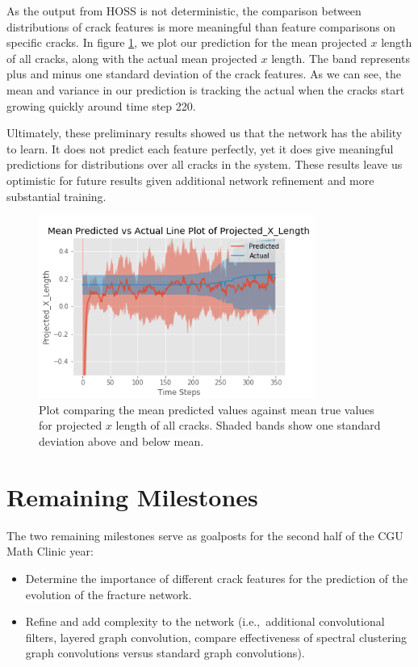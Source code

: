 As the output from HOSS is not deterministic, the comparison between distributions of crack features is more meaningful than feature comparisons on specific cracks. In figure \ref{fig:mean_proj_x_length}, we plot our prediction for the mean projected $x$ length of all cracks, along with the actual mean projected $x$ length. The band represents plus and minus one standard deviation of the crack features. As we can see, the mean and variance in our prediction is tracking the actual when the cracks start growing quickly around time step 220.

Ultimately, these preliminary results showed us that the network has the ability to learn. It does not predict each feature perfectly, yet it does give meaningful predictions for distributions over all cracks in the system. These results leave us optimistic for future results given additional network refinement and more substantial training.

\begin{figure}[!htb]
\centering
\includegraphics[width=0.8\textwidth]{images/Projected_X_Length_mean_variance_compare_ylim_test}
\caption{Plot comparing the mean predicted values against mean true values for projected $x$ length of all cracks. Shaded bands show one standard deviation above and below mean.}
\label{fig:mean_proj_x_length}
\end{figure}

\section{Remaining Milestones}
The two remaining milestones serve as goalposts for the second half of the CGU Math Clinic year:
\begin{itemize}
\item Determine the importance of different crack features for the prediction of the evolution of the fracture network.
\item Refine and add complexity to the network (i.e.,\ additional convolutional filters, layered graph convolution, compare effectiveness of spectral clustering graph convolutions versus standard graph convolutions).
\end{itemize}



